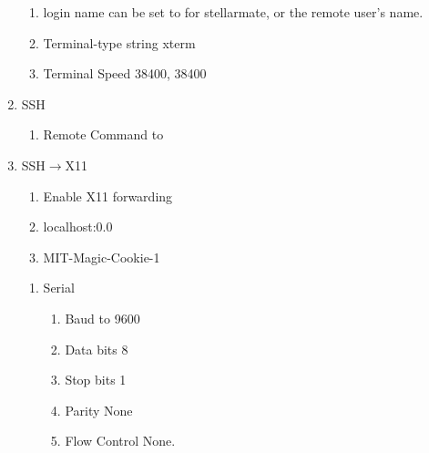 \begin{enumerate}
\begin{enumerate}
   \item   login name can be set to  for stellarmate, or
     the remote user's name.
   \item   Terminal-type string xterm
   \item   Terminal Speed 38400, 38400
\end{enumerate}
\item SSH
\vspace{-.15cm}
\begin{enumerate}\addtolength{\itemsep}{-0.5\baselineskip}
   \item   Remote Command to 
\end{enumerate}

   \item   SSH$\rightarrow$X11

\vspace{-.15cm}
\begin{enumerate}\addtolength{\itemsep}{-0.5\baselineskip}
   \item   Enable X11 forwarding
   \item   localhost:0.0
   \item   MIT-Magic-Cookie-1
\end{enumerate}
\vspace{-.15cm}
\begin{enumerate}\addtolength{\itemsep}{-0.5\baselineskip}
   \item   Serial
\vspace{-.15cm}
\begin{enumerate}\addtolength{\itemsep}{-0.5\baselineskip}
   \item   Baud to 9600
   \item   Data bits 8
   \item   Stop bits 1
   \item   Parity None
   \item   Flow Control None.
\end{enumerate}
\end{enumerate}

\end{enumerate}

